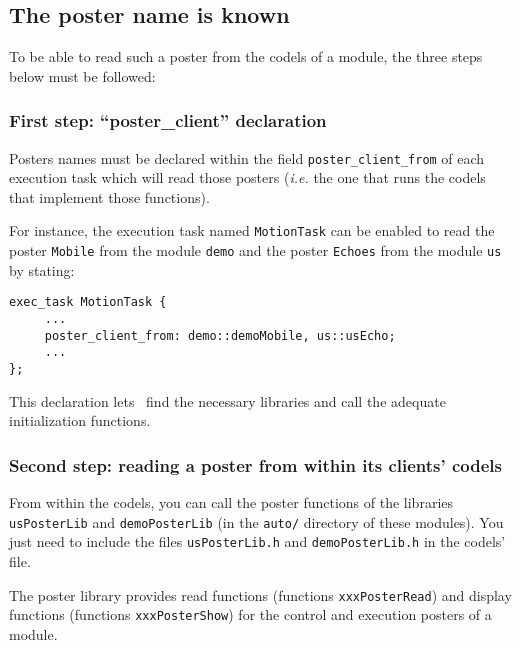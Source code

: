 \subsection{The poster name is known}

To be able to read such  a poster from the  codels of a module, the three
steps below must be followed:

\subsubsection{First step: ``poster\_client'' declaration}

Posters  names    must     be    declared   within    the      field 
\texttt{poster\_client\_from}   of each execution   task  which  will read  those
posters (\emph{i.e.}  the one that runs   the codels that implement  those
functions).

For instance, the execution task named \texttt{MotionTask} can be enabled to
read the poster  \texttt{Mobile} from the  module \texttt{demo} and  the poster
\texttt{Echoes} from the module \texttt{us} by stating:

\begin{center}\begin{cartouche}\small\begin{verbatim}
exec_task MotionTask {
     ...
     poster_client_from: demo::demoMobile, us::usEcho;
     ...
};
\end{verbatim}\end{cartouche}\end{center}

This declaration lets  \GenoM\ find the necessary  libraries and call the
adequate  initialization functions.


\subsubsection{Second step: reading a poster from within its clients'
codels}

From  within the  codels,   you can call  the  poster  functions   of the
libraries \texttt{usPosterLib} and \texttt{demoPosterLib} (in the \texttt{auto/}
directory of  these modules).  You just  need to include  the  files 
\texttt{usPosterLib.h} and \texttt{demoPosterLib.h} in the codels' file.

The  poster    library   provides   read   functions     (functions  
\texttt{xxxPosterRead}) and display functions (functions \texttt{xxxPosterShow}) for
the control and execution posters of a module.

